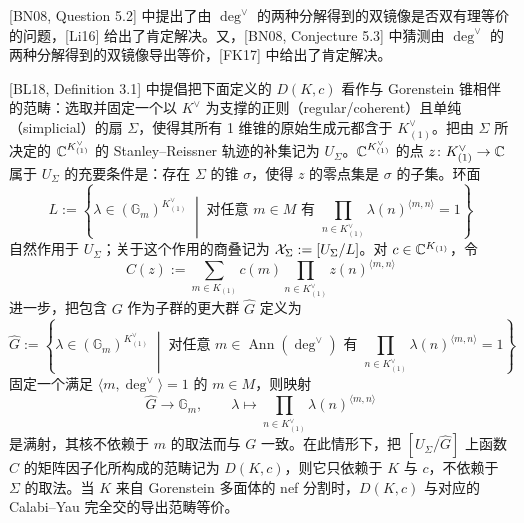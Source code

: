 [BN08, Question 5.2] 中提出了由 $\deg^\vee$ 的两种分解得到的双镜像是否双有理等价的问题，[Li16] 给出了肯定解决。又，[BN08, Conjecture 5.3] 中猜测由 $\deg^\vee$ 的两种分解得到的双镜像导出等价，[FK17] 中给出了肯定解决。

[BL18, Definition 3.1] 中提倡把下面定义的 $D(K,c)$ 看作与 Gorenstein 锥相伴的范畴：选取并固定一个以 $K^\vee$ 为支撑的正则（regular/coherent）且单纯（simplicial）的扇 $\Sigma$，使得其所有 1 维锥的原始生成元都含于 $K^\vee_{(1)}$。把由 $\Sigma$ 所决定的 $\mathbb{C}^{K^\vee_{(1)}}$ 的 Stanley–Reissner 轨迹的补集记为 $U_\Sigma$。$\mathbb{C}^{K^\vee_{(1)}}$ 的点 $z\colon K^\vee_{(1)}\to\mathbb{C}$ 属于 $U_\Sigma$ 的充要条件是：存在 $\Sigma$ 的锥 $\sigma$，使得 $z$ 的零点集是 $\sigma$ 的子集。环面
\begin{equation}
    L:=\left\{\lambda\in(\mathbb{G}_m)^{K^\vee_{(1)}} \;\middle|\; \text{对任意 } m\in M \text{ 有 } \prod_{n\in K^\vee_{(1)}}\lambda(n)^{\langle m,n\rangle}=1\right\} \tag{13.21}
\end{equation}
自然作用于 $U_\Sigma$；关于这个作用的商叠记为 $\mathcal{X}_\Sigma:=[U_\Sigma/L]$。对 $c\in\mathbb{C}^{K_{(1)}}$，令
\begin{equation}
    C(z):=\sum_{m\in K_{(1)}}c(m)\prod_{n\in K^\vee_{(1)}}z(n)^{\langle m,n\rangle} \tag{13.22}
\end{equation}
进一步，把包含 $G$ 作为子群的更大群 $\widehat G$ 定义为
\begin{equation}
    \widehat G:=\left\{\lambda\in(\mathbb{G}_m)^{K^\vee_{(1)}} \;\middle|\; \text{对任意 } m\in\operatorname{Ann}(\deg^\vee) \text{ 有 } \prod_{n\in K^\vee_{(1)}}\lambda(n)^{\langle m,n\rangle}=1\right\} \tag{13.23}
\end{equation}
固定一个满足 $\langle m,\deg^\vee\rangle=1$ 的 $m\in M$，则映射
\begin{equation}
    \widehat G\to\mathbb{G}_m,\qquad \lambda\mapsto \prod_{n\in K^\vee_{(1)}}\lambda(n)^{\langle m,n\rangle} \tag{13.24}
\end{equation}
是满射，其核不依赖于 $m$ 的取法而与 $G$ 一致。在此情形下，把 $[U_\Sigma/\widehat G]$ 上函数 $C$ 的矩阵因子化所构成的范畴记为 $D(K,c)$，则它只依赖于 $K$ 与 $c$，不依赖于 $\Sigma$ 的取法。当 $K$ 来自 Gorenstein 多面体的 nef 分割时，$D(K,c)$ 与对应的 Calabi–Yau 完全交的导出范畴等价。

